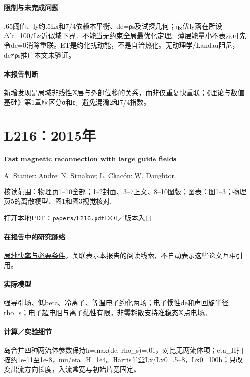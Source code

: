 \documentclass[UTF8,a4paper,11pt,openany,fontset=fandol]{ctexbook}
\begin{document}
\paragraph{限制与未完成问题}.65阈值、ly约.5Lx和7/4依赖本平衡、de=ρs及试探几何；最优ly落在所设Δ'c=100/Lx近似域下界，不能当无约束全局最优化定理。薄层能量小不表示可先令de=0消除重联。ET是约化扰动能，不是自洽热化。无动理学/Landau阻尼，de≠ρs推广本文未验证。

\paragraph{本报告判断}新增发现是局域非线性X层与外部位移的关系，而非仅重复快重联；《理论与数值基础》第1章应区分σ和ε，避免混淆2和7/4指数。

\section{L216：2015年}\label{paper:L216}

\textbf{Fast magnetic reconnection with large guide fields}\citep{L216}\

A. Stanier;  Andrei N. Simakov;  L. Chacón;  W. Daughton.

\textsf{核读范围：}物理页1–10全部；1–2封面、3–7正文、8–10图版；\textsf{图表：}图1–3；物理页5的离散模型、图1和图3视觉核对.

\href{run:../papers/L216.pdf}{打开本地PDF：\texttt{papers/L216.pdf}}\quad\href{https://doi.org/10.1063/1.4905629}{DOI／版本入口}

\paragraph{在报告中的研究脉络}\hyperref[story:fast]{局地快率与必要条件}。关联表示本报告的阅读线索，不自动表示这些论文互相引用。

\paragraph{实际模型}强导引场、低beta、冷离子、等温电子约化两场；电子惯性de和声回旋半径rho\_s；电子超电阻与离子黏性有限，非零耗散支持准稳态X点电场。

\paragraph{计算／实验细节}岛合并四种两流体参数保持h=max(de, rho\_s)=.01，对比无两流体项；eta\_H扫描约1e-11至1e-8，mu/eta\_H=1e4。Harris半盒Lx/Lx0=.5–8，Lx0=100h；只改变出流方向长度，入流盒宽与初始片宽固定。
\end{document}
